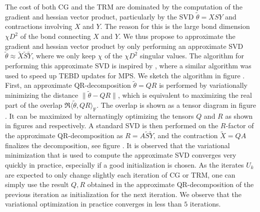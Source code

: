 The cost of both CG and the TRM are dominated by the computation of the gradient and hessian vector product, particularly by the SVD $\tilde{\theta} = XSY$ and contractions involving $X$ and $Y$. The reason for this is the large bond dimension $\chi D^2$ of the bond connecting $X$ and $Y$. We thus propose to approximate the gradient and hessian vector product by only performing an approximate SVD $\tilde{\theta} \approx \tilde{X}\tilde{S}\tilde{Y}$, where we only keep $\chi$ of the $\chi D^2$ singular values. The algorithm for performing this approximate SVD is inspired by \cite{cite:fast_time_evolution_of_mps_using_qr}, where a similar algorithm was used to speed up TEBD updates for MPS. We sketch the algorithm in figure . First, an approximate QR-decomposition $\tilde{\theta} = QR$ is performed by variationally minimizing the distance $\lVert \tilde{\theta} - QR \rVert$, which is equivalent to maximizing the real part of the overlap $\Re\langle\tilde{\theta},QR\rangle_\text{F}$. The overlap is shown as a tensor diagram in figure . It can be maximized by alternatingly optimizing the tensors $Q$ and $R$ as shown in figures  and  respectively. A standard SVD is then performed on the $R$-factor of the approximate QR-decomposition as $R = A\tilde{S}\tilde{Y}$, and the contraction $\tilde{X} = QA$ finalizes the decomposition, see figure . It is observed that the variational minimization that is used to compute the approximate SVD converges very quickly in practice, especially if a good initialization is chosen. As the iterates $U_k$ are expected to only change slightly each iteration of CG or TRM, one can simply use the result $Q, R$ obtained in the approximate QR-decomposition of the previous iteration as initialization for the next iteration. We observe that the variational optimization in practice converges in less than $5$ iterations.
